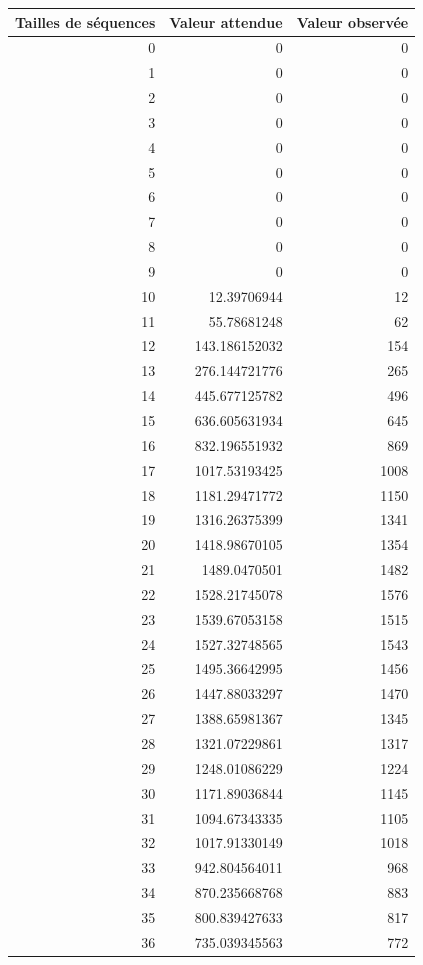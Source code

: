 \documentclass[10pt,a4paper]{article}
\begin{document}
\newpage

\begin{figure}[h]
\centering
\begin{tabular}{|r|r|r|}
\hline
Tailles de séquences & Valeur attendue & Valeur observée\\
\hline
0 & 0 & 0\\
1 & 0 & 0\\
2 & 0 & 0\\
3 & 0 & 0\\
4 & 0 & 0\\
5 & 0 & 0\\
6 & 0 & 0\\
7 & 0 & 0\\
8 & 0 & 0\\
9 & 0 & 0\\
10 & 12.39706944 & 12\\
11 & 55.78681248 & 62\\
12 & 143.186152032 & 154\\
13 & 276.144721776 & 265\\
14 & 445.677125782 & 496\\
15 & 636.605631934 & 645\\
16 & 832.196551932 & 869\\
17 & 1017.53193425 & 1008\\
18 & 1181.29471772 & 1150\\
19 & 1316.26375399 & 1341\\
20 & 1418.98670105 & 1354\\
21 & 1489.0470501 & 1482\\
22 & 1528.21745078 & 1576\\
23 & 1539.67053158 & 1515\\
24 & 1527.32748565 & 1543\\
25 & 1495.36642995 & 1456\\
26 & 1447.88033297 & 1470\\
27 & 1388.65981367 & 1345\\
28 & 1321.07229861 & 1317\\
29 & 1248.01086229 & 1224\\
30 & 1171.89036844 & 1145\\
31 & 1094.67343335 & 1105\\
32 & 1017.91330149 & 1018\\
33 & 942.804564011 & 968\\
34 & 870.235668768 & 883\\
35 & 800.839427633 & 817\\
36 & 735.039345563 & 772\\

\end{tabular}
\end{figure}
\end{document}
